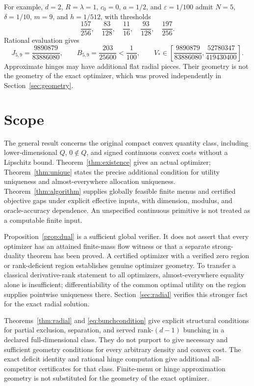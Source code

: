 \documentclass[11pt,a4paper]{article}
\numberwithin{equation}{section}
\begin{document}
For example, \(d=2\), \(R=\lambda=1\), \(c_0=0\), \(a=1/2\), and
\(\varepsilon=1/100\) admit \(N=5\), \(\delta=1/10\), \(m=9\),
and \(h=1/512\), with thresholds
\[
 \frac{157}{256},\quad\frac{83}{128},\quad\frac{11}{16},
 \quad\frac{93}{128},\quad\frac{197}{256}.
\]
Rational evaluation gives
\[
 J_{5,9}=\frac{9890879}{83886080},\qquad
 B_{5,9}=\frac{203}{25600}<\frac1{100},\qquad
 V_*\in\left[\frac{9890879}{83886080},
             \frac{52780347}{419430400}\right].
\]
Approximate hinges may have additional flat radial pieces.
Their geometry is not the geometry of the exact optimizer, which was
proved independently in Section~\ref{sec:geometry}.

\section{Scope}\label{sec:scope}
The general result concerns the original compact convex quantity class,
including lower-dimensional \(Q\), \(0\notin Q\), and signed continuous
convex costs without a Lipschitz bound.
Theorem~\ref{thm:existence} gives an actual optimizer;
Theorem~\ref{thm:unique} states the precise additional condition for
utility uniqueness and almost-everywhere allocation uniqueness.
Theorem~\ref{thm:algorithm} supplies globally feasible finite menus
and certified objective gaps under explicit effective inputs, with
dimension, modulus, and oracle-accuracy dependence.
An unspecified continuous primitive is not treated as
a computable finite input.

Proposition~\ref{prop:dual} is a sufficient global verifier.
It does not assert that every optimizer has an attained finite-mass
flow witness or that a separate strong-duality theorem has been proved.
A certified optimizer with a verified zero region or rank-deficient
region establishes genuine optimizer geometry.
To transfer a classical derivative-rank statement to all optimizers,
almost-everywhere equality alone is insufficient; differentiability
of the common optimal utility on the region supplies pointwise
uniqueness there. Section~\ref{sec:radial} verifies this stronger fact
for the exact radial solution.

Theorems~\ref{thm:radial} and \eqref{eq:bunchcondition} give explicit
structural conditions for partial exclusion, separation, and served
rank-\((d-1)\) bunching in a declared full-dimensional class.
They do not purport to give necessary and sufficient geometry conditions
for every arbitrary density and convex cost.
The exact deficit identity and rational hinge computation give
additional all-competitor certificates for that class.
Finite-menu or hinge approximation geometry is not substituted for
the geometry of the exact optimizer.
\end{document}
